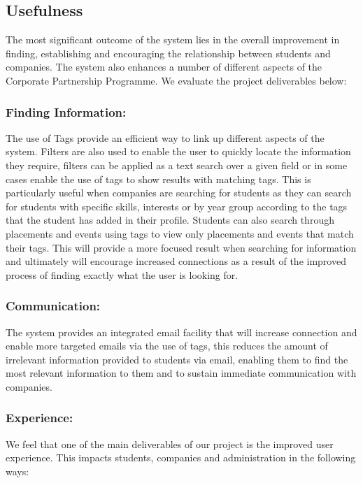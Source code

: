 \subsection{Usefulness}
  The most significant outcome of the system lies in the overall improvement in finding, establishing and encouraging the relationship between students and companies. The system also enhances a number of different aspects of the Corporate Partnership Programme. We evaluate the project deliverables below:

\subsubsection{Finding Information:}
  The use of Tags provide an efficient way to link up different aspects of the system. Filters are also used to enable the user to quickly locate the information they require, filters can be applied as a text search over a given field or in some cases enable the use of tags to show results with matching tags. This is particularly useful when companies are searching for students as they can search for students with specific skills, interests or by year group according to the tags that the student has added in their profile. Students can also search through placements and events using tags to view only placements and events that match their tags. This will provide a more focused result when searching for information and ultimately will encourage increased connections as a result of the improved process of finding exactly what the user is looking for.

\subsubsection{Communication:}
  The system provides an integrated email facility that will increase connection and enable more targeted emails via the use of tags, this reduces the amount of irrelevant information provided to students via email, enabling them to find the most relevant information to them and to sustain immediate communication with companies.

\subsubsection{Experience:}
  We feel that one of the main deliverables of our project is the improved user experience. This impacts students, companies and administration in the following ways:


